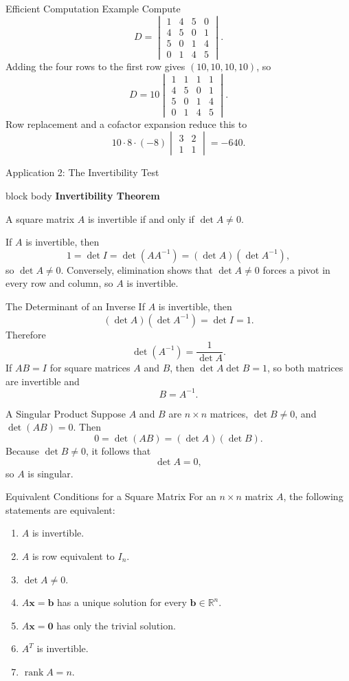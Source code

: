 \documentclass[aspectratio=169]{beamer}
\newcommand{\R}{\mathbb{R}}
\newcommand{\vect}[1]{\mathbf{#1}}
\newcommand{\rank}{\operatorname{rank}}
\newcommand{\theorembox}[2]{%
  \begin{beamercolorbox}[sep=1.2ex,wd=\linewidth]{block body}
    \textbf{#1}\par #2
  \end{beamercolorbox}}
\begin{document}
\begin{frame}{Efficient Computation Example}
\small
Compute
\[
D=\begin{vmatrix}
1&4&5&0\\4&5&0&1\\5&0&1&4\\0&1&4&5
\end{vmatrix}.
\]
Adding the four rows to the first row gives $(10,10,10,10)$, so
\[
D=10\begin{vmatrix}
1&1&1&1\\4&5&0&1\\5&0&1&4\\0&1&4&5
\end{vmatrix}.
\]
Row replacement and a cofactor expansion reduce this to
\[
10\cdot 8\cdot(-8)\begin{vmatrix}3&2\\1&1\end{vmatrix}
=\boxed{-640}.
\]
\end{frame}

\begin{frame}{Application 2: The Invertibility Test}
\theorembox{Invertibility Theorem}{A square matrix $A$ is invertible if and only if $\det A\ne0$.}
\medskip
If $A$ is invertible, then
\[
1=\det I=\det(AA^{-1})=(\det A)(\det A^{-1}),
\]
so $\det A\ne0$.
\pause
Conversely, elimination shows that $\det A\ne0$ forces a pivot in every row and column, so $A$ is invertible.
\end{frame}

\begin{frame}{The Determinant of an Inverse}
If $A$ is invertible, then
\[
(\det A)(\det A^{-1})=\det I=1.
\]
Therefore
\[
\boxed{\det(A^{-1})=\frac{1}{\det A}}.
\]
\pause
If $AB=I$ for square matrices $A$ and $B$, then $\det A\det B=1$, so both matrices are invertible and
\[
B=A^{-1}.
\]
\end{frame}

\begin{frame}{A Singular Product}
Suppose $A$ and $B$ are $n\times n$ matrices, $\det B\ne0$, and $\det(AB)=0$.
Then
\[
0=\det(AB)=(\det A)(\det B).
\]
Because $\det B\ne0$, it follows that
\[
\boxed{\det A=0},
\]
so $A$ is singular.
\end{frame}

\begin{frame}{Equivalent Conditions for a Square Matrix}
For an $n\times n$ matrix $A$, the following statements are equivalent:
\begin{enumerate}
  \item $A$ is invertible.
  \item $A$ is row equivalent to $I_n$.
  \item $\det A\ne0$.
  \item $A\vect x=\vect b$ has a unique solution for every $\vect b\in\R^n$.
  \item $A\vect x=\vect0$ has only the trivial solution.
  \item $A^T$ is invertible.
  \item $\rank A=n$.
\end{enumerate}
\end{frame}
\end{document}
